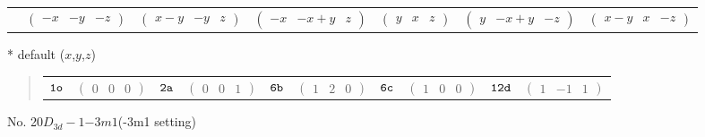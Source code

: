 \documentclass[fleqn,9pt,landscape]{jsarticle}
\begin{document}
\begin{center}
\begin{longtable}{ccccccc}
& $ \begin{pmatrix} - x & - y & - z \end{pmatrix} $ & $ \begin{pmatrix} x - y & - y & z \end{pmatrix} $ & $ \begin{pmatrix} - x & - x + y & z \end{pmatrix} $ & $ \begin{pmatrix} y & x & z \end{pmatrix} $ & $ \begin{pmatrix} y & - x + y & - z \end{pmatrix} $ & $ \begin{pmatrix} x - y & x & - z \end{pmatrix} $ \\
\end{longtable}
\end{center}
* default ($x$,$y$,$z$)
\begin{quote}
\begin{tabular}{cccccccccc}
$ {\tt 1o} $ & $ \begin{pmatrix} 0 & 0 & 0 \end{pmatrix} $ & $ {\tt 2a} $ & $ \begin{pmatrix} 0 & 0 & 1 \end{pmatrix} $ & $ {\tt 6b} $ & $ \begin{pmatrix} 1 & 2 & 0 \end{pmatrix} $ & $ {\tt 6c} $ & $ \begin{pmatrix} 1 & 0 & 0 \end{pmatrix} $ & $ {\tt 12d} $ & $ \begin{pmatrix} 1 & -1 & 1 \end{pmatrix} $
\end{tabular}
\end{quote}
\newpage
No. 20\quad$D_{3d}-1$\quad$-3m1$\quad(-3m1 setting)\quad[ trigonal ]
\end{document}
